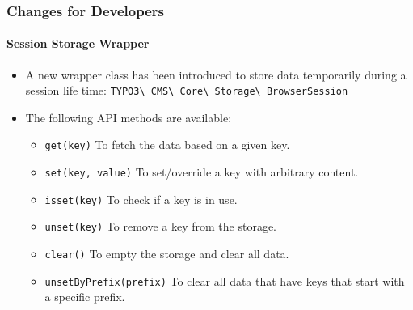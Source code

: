 %

\begin{frame}[fragile]
	\frametitle{Changes for Developers}
	\framesubtitle{Session Storage Wrapper}


	\begin{itemize}
		\item A new wrapper class has been introduced to store data temporarily
			during a session life time:
			\smaller\texttt{TYPO3\textbackslash
				CMS\textbackslash
				Core\textbackslash
				Storage\textbackslash
				BrowserSession}\normalsize
		\item The following API methods are available:
			\vspace{0.1cm}
			\begin{itemize}\smaller
				\item \texttt{get(key)}\newline
					To fetch the data based on a given key.
				\item \texttt{set(key, value)}\newline
					To set/override a key with arbitrary content.
				\item \texttt{isset(key)}\newline
					To check if a key is in use.
				\item \texttt{unset(key)}\newline
					To remove a key from the storage.
				\item \texttt{clear()}\newline
					To empty the storage and clear all data.
				\item \texttt{unsetByPrefix(prefix)}\newline
				 	To clear all data that have keys that start with a specific prefix.
			\end{itemize}\normalsize

	\end{itemize}

\end{frame}

